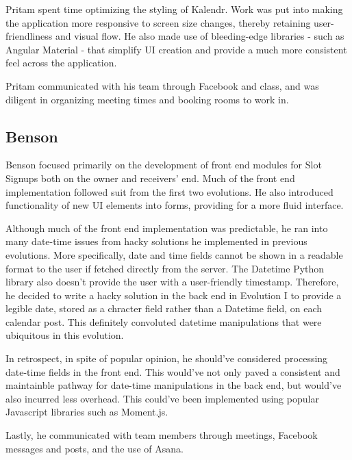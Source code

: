 \documentclass[a4paper]{article}
\begin{document}
Pritam spent time optimizing the styling of Kalendr. Work was put into making the application more responsive to screen size changes, thereby retaining user-friendliness and visual flow. He also made use of bleeding-edge libraries - such as Angular Material - that simplify UI creation and provide a much more consistent feel across the application.

Pritam communicated with his team through Facebook and class, and was diligent in organizing meeting times and booking rooms to work in. 


\subsection{Benson}
Benson focused primarily on the development of front end modules for Slot Signups both on the owner and receivers' end. Much of the front end implementation followed suit from the first two evolutions. He also introduced functionality of new UI elements into forms, providing for a more fluid interface. 

Although much of the front end implementation was predictable, he ran into many date-time issues from hacky solutions he implemented in previous evolutions. More specifically, date and time fields cannot be shown in a readable format to the user if fetched directly from the server. The Datetime Python library also doesn't provide the user with a user-friendly timestamp. Therefore, he decided to write a hacky solution in the back end in Evolution I to provide a legible date, stored as a chracter field rather than a Datetime field, on each calendar post. This definitely convoluted datetime manipulations that were ubiquitous in this evolution.

In retrospect, in spite of popular opinion, he should've considered processing date-time fields in the front end. This would've not only paved a consistent and maintainble pathway for date-time manipulations in the back end, but would've also incurred less overhead. This could've been implemented using popular Javascript libraries such as Moment.js. 

Lastly, he communicated with team members through meetings, Facebook messages and posts, and the use of Asana.
\end{document}
